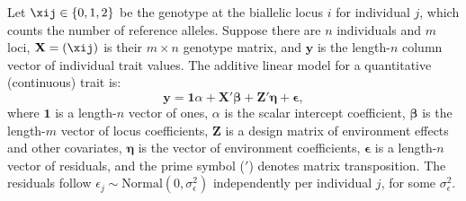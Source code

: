 \documentclass[11pt]{article}
\begin{document}
\begin{linenumbers}
Let $\xij \in \{ 0, 1, 2 \}$ be the genotype at the biallelic locus $i$ for individual $j$, which counts the number of reference alleles.
Suppose there are $n$ individuals and $m$ loci,
$\mathbf{X} = ( \xij )$ is their $m \times n$ genotype matrix, and
$\mathbf{y}$ is the length-$n$ column vector of individual trait values.
The additive linear model for a quantitative (continuous) trait is:
\begin{equation}
  \label{eq:trait}
  \mathbf{y}
  =
  \mathbf{1} \alpha + \mathbf{X}' \boldsymbol{\beta} + \mathbf{Z}' \boldsymbol{\eta} + \boldsymbol{\epsilon}
  ,
\end{equation}
where
$\mathbf{1}$ is a length-$n$ vector of ones,
$\alpha$ is the scalar intercept coefficient,
$\boldsymbol{\beta}$ is the length-$m$ vector of locus coefficients,
$\mathbf{Z}$ is a design matrix of environment effects and other covariates,
$\boldsymbol{\eta}$ is the vector of environment coefficients,
$\boldsymbol{\epsilon}$ is a length-$n$ vector of residuals,
and the prime symbol ($'$) denotes matrix transposition.
The residuals follow $\epsilon_j \sim \text{Normal}(0, \sigma^2_\epsilon)$ independently per individual $j$, for some $\sigma^2_\epsilon$.


\end{linenumbers}
\end{document}

